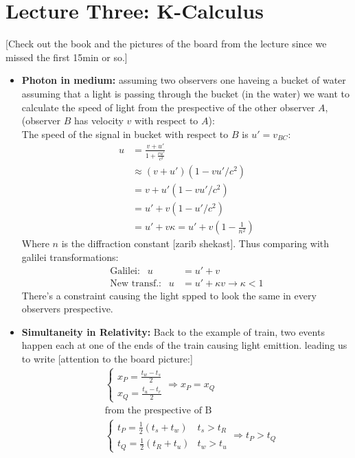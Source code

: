\documentclass[10pt,a4paper,twocolumn]{article}
\begin{document}
        \section{Lecture Three: K-Calculus}
        [Check out the book and the pictures of the board from the lecture since we missed the first 15min or so.]
        \begin{itemize}
            \item \textbf{Photon in medium: } assuming two observers one haveing a bucket of water assuming that a light is passing through the bucket (in the water) we want to  calculate the speed of light from the prespective of the other observer $A$, (observer $B$ has velocity $v$ with respect to $A$):
            \\
            The speed of the signal in bucket with respect to $B$ is $u' =v_{BC}$:
            \begin{align*}
                u &= \frac{v+u'}{1+\frac{vu'}{c^2}}\\
                &\approx (v+u')(1-vu'/c^2)\\
                &= v +u'(1-vu'/c^2)\\
                &= u' + v(1-u'/c^2)\\
                &= u' + v \kappa = u' + v(1-\frac1{n^2})
            \end{align*}
            Where $n$ is the diffraction constant [zarib shekast]. Thus comparing with galilei transformations:
            \begin{align}
                \text{Galilei: } \ \ u &= u' + v\\
                \text{New transf.: }  \ \ u &= u' +\kappa v \rightarrow \kappa <1
            \end{align}
            There's a constraint causing the light spped to look the same in every observers prespective.
            \item \textbf{Simultaneity in Relativity: } Back to the example of train, two events happen each at one of the ends of the train causing light emittion. leading us to write [attention to the board picture:] 
            \begin{align*}
                &\left\{ \begin{matrix}
                x_P = \frac{t_w-t_s}{2}\\
                x_Q = \frac{t_u-t_r}{2}
                \end{matrix}\right.\Rightarrow x_P=x_Q\\
                &\text{from the prespective of B}\\
                &\left\{\begin{matrix}
                t_P = \frac12 (t_s+t_w) & t_s > t_R\\
                t_Q =\frac12 (t_R+t_u) & t_w >t_u
                \end{matrix} \right.\Rightarrow t_P>t_Q
            \end{align*}
        \end{itemize}
\end{document}
